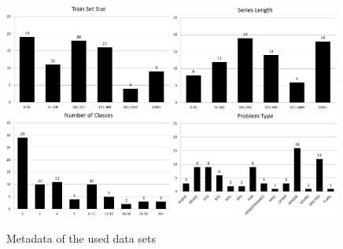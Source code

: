 \begin{figure}
    \captionsetup{justification=raggedright}
    \includegraphics[width=0.49\textwidth,keepaspectratio]{Train_size_hist.JPG}
    \includegraphics[width=0.49\textwidth,keepaspectratio]{Length_hist.JPG}
    \\[\smallskipamount]
    \includegraphics[width=0.49\textwidth,keepaspectratio]{Classes_hist.JPG}
    \includegraphics[width=0.49\textwidth,keepaspectratio]{Problem_hist.JPG}
    \caption{Metadata of the used data sets}
    \label{fig:DatasetsMetadata}
\end{figure}

